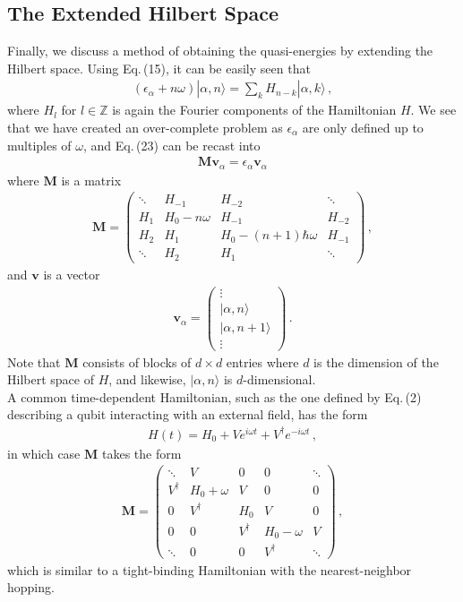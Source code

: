 \documentclass[reprint, amsmath, amssymb, aps]{revtex4-2}
\begin{document}
\subsection{The Extended Hilbert Space}
Finally, we discuss a method of obtaining the quasi-energies by extending the Hilbert space. Using Eq.\,(15), it can be easily seen that 
\begin{align}
(\epsilon_\alpha + n \omega) | \alpha, n\rangle = \sum_{k} H_{n-k}|\alpha, k\rangle\,,
\end{align}
where $H_{l}$ for $l \in \mathbb{Z}$ is again the Fourier components of the Hamiltonian $H$. We see that we have created an over-complete problem as $\epsilon_\alpha$ are only defined up to multiples of $\omega$, and Eq.\,(23) can be recast into 
\begin{align}
\mathbf{M} \mathbf{v}_\alpha = \epsilon_\alpha \mathbf{v}_\alpha
\end{align}
where $\mathbf{M}$ is a matrix
\begin{align}
\mathbf{M} = \begin{pmatrix}
\ddots & H_{-1} & H_{-2} & \ddots \\
H_1 & H_0 -n\omega & H_{-1} & H_{-2} \\
H_2 & H_1 & H_0-(n+1) \hbar \omega & H_{-1}\\
\ddots & H_2 & H_1 & \ddots
\end{pmatrix}
\,, 
\end{align}
and $\mathbf{v}$ is a vector
\begin{align}
\mathbf{v}_\alpha = 
\begin{pmatrix}
\vdots\\
|\alpha, n\rangle \\
|\alpha, n+1\rangle\\
\vdots
\end{pmatrix}\,.
\end{align}
Note that $\mathbf{M}$ consists of blocks of $d\times d$ entries where $d$ is the dimension of the Hilbert space of $H$, and likewise, $|\alpha, n\rangle$ is $d$-dimensional.\\

A common time-dependent Hamiltonian, such as the one defined by Eq.\,(2) describing a qubit interacting with an external field, has the form
\begin{align}
H(t) = H_0 + Ve^{i\omega t} + V^\dagger e^{-i\omega t}\,,
\end{align}
in which case $\mathbf{M}$ takes the form
\begin{align}
\mathbf{M} = 
\begin{pmatrix}
\ddots & V & 0 & 0& \ddots \\
V^\dagger & H_0 +\omega & V & 0 & 0 \\
0& V^\dagger & H_0 & V&0\\
0 & 0 & V^\dagger & H_0 - \omega & V \\
\ddots & 0 & 0 & V^\dagger &\ddots
\end{pmatrix}
\,, 
\end{align}
which is similar to a tight-binding Hamiltonian with the nearest-neighbor hopping. \\
\end{document}
